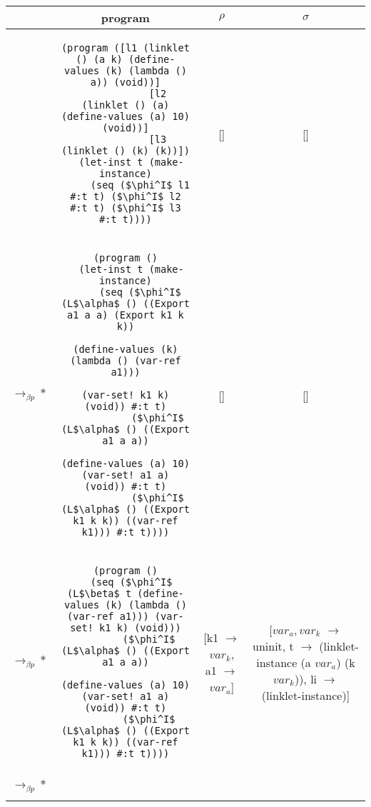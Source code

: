 \vspace{0.25cm}

\begin{adjustbox}{center}
  \footnotesize
  \begin{tabular}{lc|c|c}
    &\textbf{program} & \textbf{$\rho$} & \textbf{$\sigma$} \\ \hline \hline
    &\begin{lstlisting}[mathescape]
(program ([l1 (linklet () (a k) (define-values (k) (lambda () a)) (void))]
           [l2 (linklet () (a) (define-values (a) 10) (void))]
           [l3 (linklet () (k) (k))])
  (let-inst t (make-instance)
     (seq ($\phi^I$ l1 #:t t) ($\phi^I$ l2 #:t t) ($\phi^I$ l3 #:t t))))
    \end{lstlisting} & [] & [] \\ \hline
    $\longrightarrow_{\beta p}*$&\begin{lstlisting}[mathescape]
(program ()
  (let-inst t (make-instance)
     (seq ($\phi^I$ (L$\alpha$ () ((Export a1 a a) (Export k1 k k))
                   (define-values (k) (lambda () (var-ref a1)))
                   (var-set! k1 k) (void)) #:t t)
           ($\phi^I$ (L$\alpha$ () ((Export a1 a a))
                   (define-values (a) 10) (var-set! a1 a) (void)) #:t t)
           ($\phi^I$ (L$\alpha$ () ((Export k1 k k)) ((var-ref k1))) #:t t))))
    \end{lstlisting} & [] & [] \\ \hline
    $\longrightarrow_{\beta p}*$&\begin{lstlisting}[mathescape]
(program ()
  (seq ($\phi^I$ (L$\beta$ t (define-values (k) (lambda () (var-ref a1))) (var-set! k1 k) (void)))
        ($\phi^I$ (L$\alpha$ () ((Export a1 a a))
                (define-values (a) 10) (var-set! a1 a) (void)) #:t t)
        ($\phi^I$ (L$\alpha$ () ((Export k1 k k)) ((var-ref k1))) #:t t))))
    \end{lstlisting} & \thead{[k1 $\rightarrow$ $var_k$, \\a1 $\rightarrow$ $var_a$]} & \thead{[$var_a,var_k$ $\rightarrow$ uninit,\\ t $\rightarrow$ (linklet-instance \\ (a $var_a$) (k $var_k$)), \\li $\rightarrow$ (linklet-instance)]} \\ \hline
    $\longrightarrow_{\beta p}*$&\begin{lstlisting}[mathescape]

\end{lstlisting}
\end{tabular}
\end{adjustbox}
